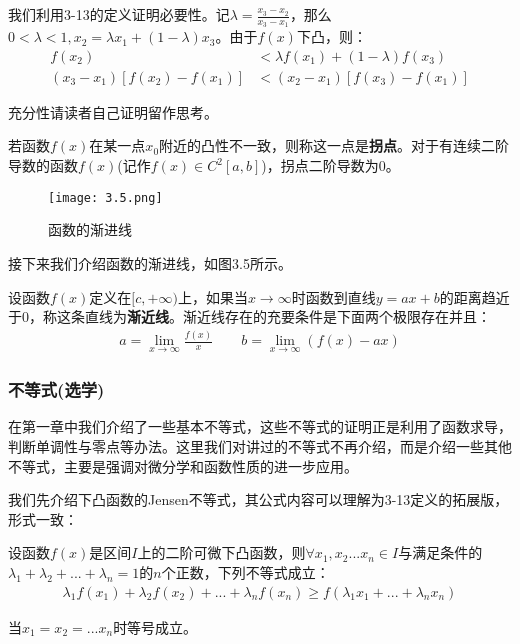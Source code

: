 \documentclass{ctexart}
\let\oldtextbf\textbf %
\renewcommand{\textbf}[1]{\textcolor{btex}{\oldtextbf{#1}}} %
\begin{document}
我们利用3-13的定义证明必要性。记$\lambda=\frac{x_3-x_2}{x_3-x_1}$，那么$0<\lambda<1,x_2=\lambda x_1+(1-\lambda)x_3$。由于$f(x)$下凸，则：
\begin{align*}
    f(x_2)&<\lambda f(x_1)+(1-\lambda)f(x_3)\\
    (x_3-x_1)[f(x_2)-f(x_1)]&<(x_2-x_1)[f(x_3)-f(x_1)]
\end{align*}

充分性请读者自己证明留作思考。

若函数$f(x)$在某一点$x_0$附近的凸性不一致，则称这一点是\textbf{拐点}。对于有连续二阶导数的函数$f(x)$(记作$f(x)\in C^2[a,b]$)，拐点二阶导数为0。
\begin{figure}[H] 
\centering     
\renewcommand{\figurename}{图}     
\renewcommand{\thefigure}{3.5}    
\begin{myimagebox}[width=0.3\textwidth] %
\texttt{[image: 3.5.png]} %
\end{myimagebox}     
\caption{\label{fig:3.5}函数的渐进线}   
\end{figure}

接下来我们介绍函数的渐进线，如图3.5所示。
\begin{tcolorbox}[
    colback=bac2,     %
    colframe=fra2,   %
    coltitle=white,             %
    coltext=tex2,
    title=渐近线,
    fonttitle=\bfseries,        %
arc=3mm,                     %
breakable
]
设函数$f(x)$定义在$[c,+\infty)$上，如果当$x\to\infty$时函数到直线$y=ax+b$的距离趋近于0，称这条直线为\textbf{渐近线}。渐近线存在的充要条件是下面两个极限存在并且：
\begin{align*}
    a=\lim_{x\to\infty}\frac{f(x)}{x}\qquad b=\lim_{x\to\infty}(f(x)-ax)
\end{align*}
\end{tcolorbox}

\subsubsection{不等式(选学)}
在第一章中我们介绍了一些基本不等式，这些不等式的证明正是利用了函数求导，判断单调性与零点等办法。这里我们对讲过的不等式不再介绍，而是介绍一些其他不等式，主要是强调对微分学和函数性质的进一步应用。

我们先介绍下凸函数的Jensen不等式，其公式内容可以理解为3-13定义的拓展版，形式一致：

\begin{tcolorbox}[
    colback=bac1,     %
    colframe=fra1,   %
    coltitle=white,             %
    coltext=tex1,
    title=下凸函数的Jensen不等式,
    fonttitle=\bfseries,        %
arc=3mm,                     %
breakable
]
设函数$f(x)$是区间$I$上的二阶可微下凸函数，则$\forall x_1,x_2...x_n\in I$与满足条件的$\lambda_1+\lambda_2+...+\lambda_n=1$的$n$个正数，下列不等式成立：
\begin{align*}
    \lambda_1f(x_1)+\lambda_2f(x_2)+...+\lambda_nf(x_n)\geq f(\lambda_1x_1+...+\lambda_nx_n)\tag{3-15}
\end{align*}

当$x_1=x_2=...x_n$时等号成立。
\end{tcolorbox}
\end{document}
